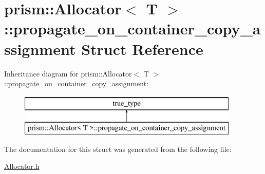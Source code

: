\hypertarget{structprism_1_1_allocator_1_1propagate__on__container__copy__assignment}{}\section{prism\+:\+:Allocator$<$ T $>$\+:\+:propagate\+\_\+on\+\_\+container\+\_\+copy\+\_\+assignment Struct Reference}
\label{structprism_1_1_allocator_1_1propagate__on__container__copy__assignment}
Inheritance diagram for prism\+:\+:Allocator$<$ T $>$\+:\+:propagate\+\_\+on\+\_\+container\+\_\+copy\+\_\+assignment\+:\begin{figure}[H]
\begin{center}
\leavevmode
\includegraphics[height=2.000000cm]{structprism_1_1_allocator_1_1propagate__on__container__copy__assignment}
\end{center}
\end{figure}


The documentation for this struct was generated from the following file\+:\begin{DoxyCompactItemize}
\item 
\hyperlink{_allocator_8h}{Allocator.\+h}\end{DoxyCompactItemize}
